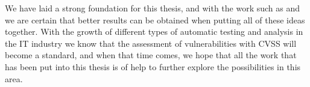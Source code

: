 We have laid a strong foundation for this thesis, and with the work such as \parencite{ognawala} and \parencite{novelty,} we are certain that better results can be obtained when putting all of these ideas together. With the growth of different types of automatic testing and analysis in the IT industry we know that the assessment of vulnerabilities with CVSS will become a standard, and when that time comes, we hope that all the work that has been put into this thesis is of help to further explore the possibilities in this area.